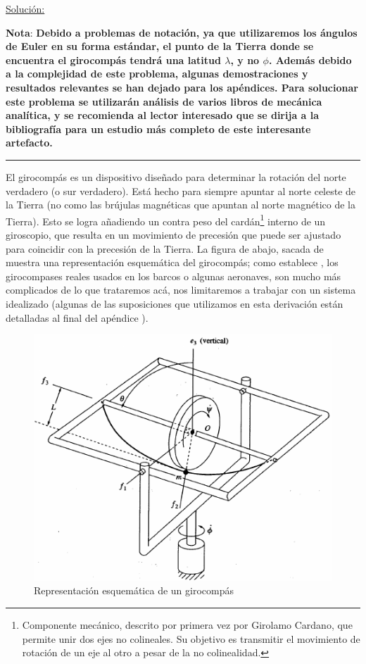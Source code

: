 \documentclass[a4paper,10pt]{article}
\numberwithin{equation}{section}
\begin{document}
\vspace{.3cm}

\underline{Solución:} \vspace{.3cm}

\textbf{Nota}: \textbf{Debido a problemas de notación, ya que utilizaremos los 
ángulos de Euler en su forma estándar, el punto de la Tierra donde
se encuentra el girocompás tendrá una latitud $\lambda$, y no $\phi$. Además
debido a la complejidad de este problema, algunas demostraciones y resultados relevantes 
se han dejado para los apéndices. Para solucionar este problema se utilizarán análisis 
de varios libros de mecánica analítica, y se recomienda al lector interesado que se dirija 
a la bibliografía para un estudio más completo de este interesante artefacto.}

\noindent\rule[0.5ex]{\linewidth}{1pt}

\vspace{.3cm}

El girocompás es un dispositivo diseñado para determinar la rotación del norte verdadero 
(o sur verdadero). Está hecho para siempre apuntar al norte celeste de la Tierra (no como 
las brújulas magnéticas que apuntan al norte magnético de la Tierra). Esto se logra 
añadiendo un contra peso del cardán\footnote{Componente mecánico, descrito por primera vez por Girolamo
Cardano, que permite unir dos ejes no colineales. Su objetivo es transmitir el movimiento de rotación de un
eje al otro a pesar de la no colinealidad.} interno de un giroscopio, que resulta en un 
movimiento de precesión que puede ser ajustado para coincidir con la precesión de 
la Tierra. La figura de abajo, sacada de \cite{baruh} muestra una representación 
esquemática del girocompás; como establece \cite{saletan}, los girocompases reales 
usados en los barcos o algunas aeronaves, son mucho más complicados de lo que trataremos 
acá, nos limitaremos a trabajar con un sistema idealizado (algunas de las suposiciones 
que utilizamos en esta derivación están detalladas al final del apéndice ).

\begin{figure}[H]
 \center 
 \includegraphics[scale=0.5]{problema3fig1}
 \caption{Representación esquemática de un girocompás}
 \label{fig:problema3fig1}
\end{figure}
\end{document}
